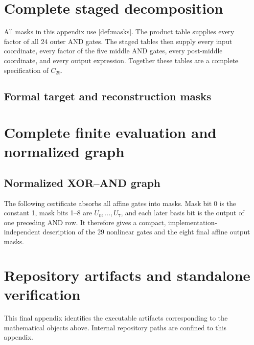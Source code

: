 \documentclass[11pt]{article}
\theoremstyle{definition}
\begin{document}
\appendix

\section{Complete staged decomposition}
\label{app:decomposition}

All masks in this appendix use \cref{def:masks}.  The product table supplies every factor of all 24
outer AND gates.  The staged tables then supply every input coordinate, every factor of the five
middle AND gates, every post-middle coordinate, and every output expression.  Together these tables
are a complete specification of \(C_{29}\).




\subsection{Formal target and reconstruction masks}


\section{Complete finite evaluation and normalized graph}
\label{app:finite}



\subsection{Normalized XOR--AND graph}

The following certificate absorbs all affine gates into masks.  Mask bit 0 is the constant 1, mask
bits 1--8 are \(U_0,\ldots,U_7\), and each later basis bit is the output of one preceding AND row.
It therefore gives a compact, implementation-independent description of the 29 nonlinear gates and
the eight final affine output masks.



\section{Repository artifacts and standalone verification}
\label{app:artifacts}

This final appendix identifies the executable artifacts corresponding to the mathematical objects
above.  Internal repository paths are confined to this appendix.
\end{document}
